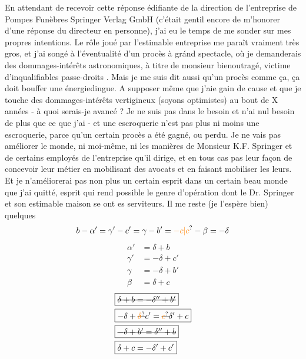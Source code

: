 En attendant de recevoir cette réponse édifiante de la direction de l'entreprise de Pompes Funèbres Springer Verlag GmbH (c'était gentil encore de m'honorer d'une réponse  du directeur en personne), j'ai eu le temps de me sonder sur mes propres intentions. Le rôle joué par l'estimable entreprise me paraît vraiment très gros, et j'ai songé à l'éventualité d'un procès à gránd spectacle, où je demanderais des dommages-intérêts astronomiques, à titre de monsieur bien\handwritten{/}outragé,  victime d'inqualifiables passe-droits . Mais je me suis dit aussi  qu'un procès comme ça, ça doit bouffer une énergie\handwritten{\(\vert\)}dingue. A supposer même que j'aie gain de cause et que je touche des dommages-intérêts vertigineux (soyons optimistes\unsure{)|!})\handwritten{,} au bout de X années\deleted{\unsure{,}} - à quoi serais-je avancé ? Je ne suis pas dans le besoin et n'ai nul besoin de plus que ce que j'ai - et une escroquerie n'est pas plus ni moins une escroquerie, parce qu'un certain procès a été gagné, ou perdu. Je ne vais pas améliorer le monde, ni moi-même, ni les manières de Monsieur K.F. Springer et de certains employés de l'entreprise qu'il dirige, et en tous cas pas leur façon de concevoir leur métier\handwritten{,} en mobilisant des avocats et en  faisant mobiliser les leurs\inserted{\handwritten{(*)}}.  Et je n'améliorerai pas non plus un certain esprit dans un certain beau monde que j'ai quitté, esprit qui rend possible le genre d'opération dont le Dr. Springer et son estimable  maison se ont  es serviteurs. Il me reste (je l'espère bien) quelques
\[
b-\alpha'=\gamma'-c'=\gamma-b'=\unsure{-c|c}-\beta=-\delta
\]
\[
\begin{aligned}
\alpha'&=\delta+b\\
\gamma'&=-\delta+c'\\
\gamma&=-\delta+b'\\
\beta&=\delta+c
\end{aligned}
\]
\[
\begin{aligned}
&\boxed{\deleted{\delta+b=-\delta''+b'}}\\
&\boxed{-\delta+\deleted{\unsure{\delta}}c'=\deleted{\unsure{c}}\delta'+c}\\
&\boxed{\deleted{-\delta+b'=\delta''+b}}\\
&\boxed{\delta+c=-\delta'+c'}
\end{aligned}
\]
